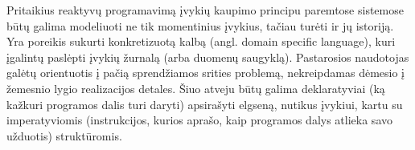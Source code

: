 Pritaikius reaktyvų programavimą įvykių kaupimo principu paremtose sistemose būtų galima modeliuoti ne tik momentinius įvykius, tačiau turėti ir jų istoriją. Yra poreikis sukurti konkretizuotą kalbą (angl. domain specific language), kuri įgalintų paslėpti įvykių žurnalą (arba duomenų saugyklą). Pastarosios naudotojas galėtų orientuotis į pačią sprendžiamos srities problemą, nekreipdamas dėmesio į žemesnio lygio realizacijos detales. Šiuo atveju būtų galima deklaratyviai (ką kažkuri programos dalis turi daryti) apsirašyti elgseną, nutikus įvykiui, kartu su imperatyviomis (instrukcijos, kurios aprašo, kaip programos dalys atlieka savo užduotis) struktūromis.






